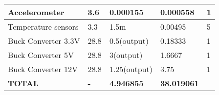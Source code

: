 \begin{table}[]
\begin{tabular}{|l|l|l|l|l|}
Accelerometer           & 3.6                             & 0.000155                            & 0.000558                     & 1                 \\ \hline
Temperature sensors     & 3.3                             & 1.5m                                & 0.00495                      & 5                 \\ \hline
Buck Converter 3.3V     & 28.8                            & 0.5(output)                         & 0.18333                      & 1                 \\ \hline
Buck Converter 5V       & 28.8                            & 3(output)                           & 1.6667                       & 1                 \\ \hline
Buck Converter 12V      & 28.8                            & 1.25(output)                        & 3.75                         & 1                 \\ \hline
\textbf{TOTAL}          & \textbf{-}                      & \textbf{4.946855}                   & \textbf{38.019061}           &                   \\ \hline
\end{tabular}
\label{table: power consumption}
\end{table}

\raggedbottom